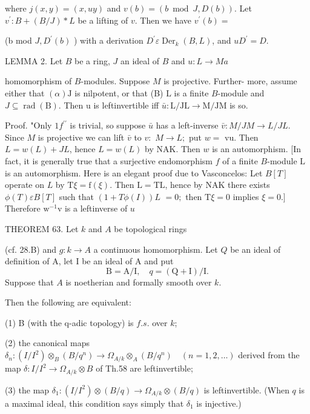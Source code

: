 where $j(x, y)=(x, u y)$ and $v(b)=(b \bmod J, D(b))$. Let $v^{\prime}: B+(B / J) * L$ be a lifting of $v .$ Then we have $v^{\prime}(b)=$

(b mod $J, D^{\prime}(b)$ ) with a derivation $D^{\prime} \varepsilon \operatorname{Der}_{k}(B, L)$, and $u D^{\prime}=D$.

LEMMA 2. Let $B$ be a ring, $J$ an ideal of $B$ and $u: L \rightarrow M a$

homomorphism of $B$-modules. Suppose $M$ is projective. Further- more, assume either that $(\alpha) \mathrm{J}$ is nilpotent, or that (B) $\mathrm{L}$ is a finite $B$-module and $J \subseteq \operatorname{rad}(\mathrm{B})$. Then u is leftinvertible iff $\bar{u}: \mathrm{L} / \mathrm{JL} \rightarrow \mathrm{M} / \mathrm{JM}$ is so.

Proof. "Only $1 f^{\prime \prime}$ is trivial, so suppose $\bar{u}$ has a left-inverse $\bar{v}: M / J M \rightarrow L / J L$. Since $M$ is projective we can lift $\bar{v}$ to $v:$ $M \rightarrow L ;$ put $w=$ vu. Then $L=w(L)+J L$, hence $L=w(L)$ by NAK. Then $w$ is an automorphism. [In fact, it is generally true that a surjective endomorphism $f$ of a finite $B$-module $\mathrm{L}$ is an automorphism. Here is an elegant proof due to Vasconcelos: Let $B[T]$ operate on $L$ by $\mathrm{T} \xi=\mathrm{f}(\xi)$. Then $\mathrm{L}=\mathrm{TL}$, hence by NAK there exists $\phi(T) \varepsilon B[T]$ such that $(1+T \phi(I)) L$ $=0 ;$ then $\mathrm{T} \xi=0$ implies $\xi=0 .]$ Therefore $\mathrm{w}^{-1} \mathrm{v}$ is a leftinverse of $u$

THEOREM 63. Let $k$ and $A$ be topological rings

(cf. 28.B) and $g: k \rightarrow A$ a continuous homomorphism. Let $Q$ be an ideal of definition of A, let I be an ideal of A and put
$$
\mathrm{B}=\mathrm{A} / \mathrm{I}, \quad q=(\mathrm{Q}+\mathrm{I}) / \mathrm{I} .
$$
Suppose that $A$ is noetherian and formally smooth over $k$.

Then the following are equivalent:

(1) B (with the q-adic topology) is $f . s$. over $k$;

(2) the canonical maps $\delta_{n}:\left(I / I^{2}\right) \otimes_{B}\left(B / q^{n}\right) \rightarrow \Omega_{A / k} \otimes_{A}\left(B / q^{n}\right) \quad(n=1,2, \ldots)$ derived from the map $\delta: I / I^{2} \rightarrow \Omega_{A / k} \otimes B$ of Th.58 are leftinvertible;

(3) the map $\delta_{1}:\left(I / I^{2}\right) \otimes(B / q) \rightarrow \Omega_{A / k} \otimes(B / q)$ is leftinvertible. (When $q$ is a maximal ideal, this condition says simply that $\delta_{1}$ is injective.)

